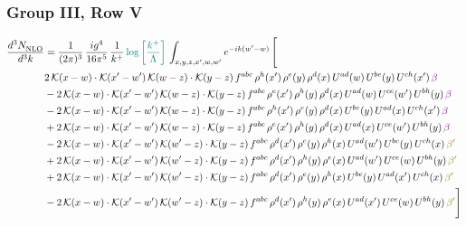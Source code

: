 \documentclass[9pt]{article}
\numberwithin{equation}{section}
\begin{document}
\subsubsection{Group III, Row V}     
\begin{align}
     \frac{d^{3}N_{\rm NLO}^{\rm}}{d^{3}k}  & = \frac{1}{(2\pi)^{3}}\, \frac{ig^{4}}{16\pi^{5}}\, \frac{1}{k^{+}}\, {\color{teal}\log{\left[\frac{k^{+}}{\Lambda}\right]}}\,\int_{x,y,z,x^{\prime},w,w^{\prime}}e^{-ik(w^{\prime}-w)}\, \Bigg[\notag \\ & 2\,\mathcal{K}(x-w)\cdot\mathcal{K}(x'-w')\,\mathcal{K}(w-z)\cdot\mathcal{K}(y-z)\, f^{abc}\,\rho^{h}(x')\,\rho^{e}(y)\,\rho^{d}(x)\,U^{ad}(w)\,U^{be}(y)\,U^{ch}(x')\,{\color{violet}\beta}\notag\\ &-2\,\mathcal{K}(x-w)\cdot\mathcal{K}(x'-w')\,\mathcal{K}(w-z)\cdot\mathcal{K}(y-z)\, f^{abc}\,\rho^{e}(x')\,\rho^{h}(y)\,\rho^{d}(x)\,U^{ad}(w)\,U^{ce}(w')\,U^{bh}(y)\,{\color{violet}\beta} \notag\\ & -2\,\mathcal{K}(x-w)\cdot\mathcal{K}(x'-w')\,\mathcal{K}(w-z)\cdot\mathcal{K}(y-z)\, f^{abc}\,\rho^{h}(x')\,\rho^{e}(y)\,\rho^{d}(x)\,U^{be}(y)\,U^{ad}(x)\,U^{ch}(x')\,{\color{violet}\beta} \notag\\ &+2\,\mathcal{K}(x-w)\cdot\mathcal{K}(x'-w')\,\mathcal{K}(w-z)\cdot\mathcal{K}(y-z)\, f^{abc}\,\rho^{e}(x')\,\rho^{h}(y)\,\rho^{d}(x)\,U^{ad}(x)\,U^{ce}(w')\,U^{bh}(y)\,{\color{violet}\beta}\notag \\ & -2\, \mathcal{K}(x-w) \cdot \mathcal{K}(x'-w')\, \mathcal{K}(w'-z) \cdot \mathcal{K}(y-z)\, f^{abc}\, \rho^{d}(x')\,\rho^{e}(y)\, \rho^{h}(x)\,U^{ad}(w')\,U^{be}(y)\,U^{ch}(x)\, {\color{olive} \beta'}\notag \\ & + 2\, \mathcal{K}(x-w) \cdot \mathcal{K}(x'-w')\, \mathcal{K}(w'-z) \cdot \mathcal{K}(y-z)\, f^{abc}\, \rho^{d}(x')\,\rho^{h}(y)\, \rho^{e}(x)\,U^{ad}(w')\,U^{ce}(w)\,U^{bh}(y)\, {\color{olive} \beta'}\notag \\ & +2\, \mathcal{K}(x-w) \cdot \mathcal{K}(x'-w')\, \mathcal{K}(w'-z) \cdot \mathcal{K}(y-z)\, f^{abc}\, \rho^{d}(x')\,\rho^{e}(y)\, \rho^{h}(x)\,U^{be}(y)\,U^{ad}(x')\,U^{ch}(x)\, {\color{olive} \beta'}\notag \\ & -2\, \mathcal{K}(x-w) \cdot \mathcal{K}(x'-w')\, \mathcal{K}(w'-z) \cdot \mathcal{K}(y-z)\, f^{abc}\, \rho^{d}(x')\,\rho^{h}(y)\, \rho^{e}(x)\,U^{ad}(x')\,U^{ce}(w)\,U^{bh}(y)\, {\color{olive} \beta'}\Bigg]
     \end{align} 
\end{document}
